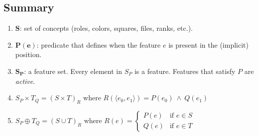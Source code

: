\subsection{Summary}

\begin{enumerate}
\item $\bm S$: set of concepts (roles, colors, squares, files, ranks, etc.).
\item $\bm{P(e)}$: predicate that defines when the feature $e$ is present in the (implicit) position.
\item ${\bm S}_{\bm P}$: a feature set. Every element in $S_P$ is a feature. Features that satisfy $P$ are \textit{active}.
\item $S_P \times T_Q={(S \times T)}_{R}$ where $R(\langle e_0, e_1 \rangle) = P(e_0)\ \land\ Q(e_1)$
\item $S_P \oplus T_Q={(S \cup T)}_R$ where $R(e) = \begin{cases}
        P(e) & \text{if } e \in S \\
        Q(e) & \text{if } e \in T
    \end{cases}
$
\end{enumerate}
